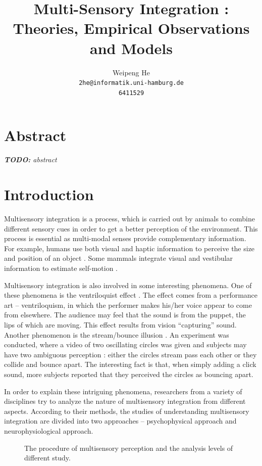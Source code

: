\documentclass{article}[11pt]
\title{Multi-Sensory Integration : Theories, Empirical Observations and Models}
\author{Weipeng He \\ \texttt{2he@informatik.uni-hamburg.de} \\ \texttt{6411529}}
\newcommand{\inputTikZ}[1]{%
}
\newcommand{\TODO}[1]{\emph{\small{{\bf TODO: } #1}}}
\begin{document}
\maketitle

\section*{Abstract}
\TODO{abstract}


\section{Introduction}
\label{sec:intro}

Multisensory integration is a process, which is carried out by animals to combine different sensory cues in order to get a better perception of the environment. This process is essential as multi-modal senses provide complementary information.
For example, humans use both visual and haptic information to perceive the size and position of an object \cite{ernst_humans_2002}. Some mammals integrate visual and vestibular information to estimate self-motion \cite{gu_visual_2006}.

Multisensory integration is also involved in some interesting phenomena. One of these phenomena is the ventriloquist effect \cite{alais_ventriloquist_2004}. The effect comes from a performance art -- ventriloquism, in which the performer makes his/her voice appear to come from elsewhere. The audience may feel that the sound is from the puppet, the lips of which are moving. This effect results from vision ``capturing'' sound.
Another phenomenon is the stream/bounce illusion \cite{sekuler_sound_1997}. An experiment was conducted, where a video of two oscillating circles was given and subjects may have two ambiguous perception : either the circles stream pass each other or they collide and bounce apart. The interesting fact is that, when simply adding a click sound, more subjects reported that they perceived the circles as bouncing apart.

In order to explain these intriguing phenomena, researchers from a variety of disciplines try to analyze the nature of multisensory integration from different aspects. According to their methods, the studies of understanding multisensory integration are divided into two approaches -- psychophysical approach and neurophysiological approach.

\begin{figure}[tpbh]
  \centering \inputTikZ{flow}
  \caption{The procedure of multisensory perception and the analysis levels of different study.}
  \label{fig:flow}
\end{figure}
\end{document}
